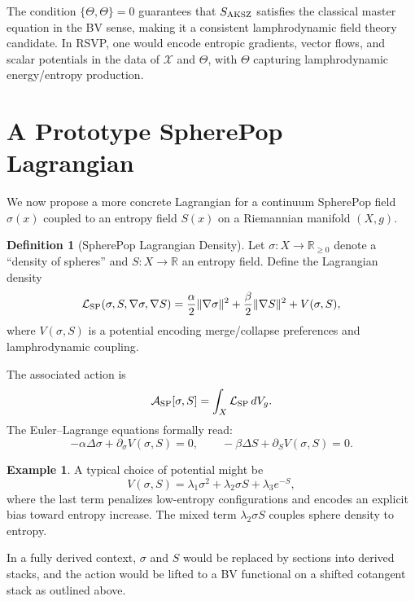 \documentclass[12pt]{article}
\theoremstyle{plain}
\theoremstyle{definition}
\newtheorem{definition}[theorem]{Definition}
\newtheorem{example}[theorem]{Example}
\theoremstyle{remark}
\begin{document}
The condition $\{\Theta,\Theta\}=0$ guarantees that $S_{\rm AKSZ}$ satisfies
the classical master equation in the BV sense, making it a consistent
lamphrodynamic field theory candidate. In RSVP, one would encode entropic
gradients, vector flows, and scalar potentials in the data of $\mathcal{X}$ and
$\Theta$, with $\Theta$ capturing lamphrodynamic energy/entropy production.


\section{A Prototype SpherePop Lagrangian}

We now propose a more concrete Lagrangian for a continuum SpherePop field
$\sigma(x)$ coupled to an entropy field $S(x)$ on a Riemannian manifold
$(X,g)$.

\begin{definition}[SpherePop Lagrangian Density]
Let $\sigma: X\to \mathbb{R}_{\ge 0}$ denote a ``density of spheres'' and
$S: X\to\mathbb{R}$ an entropy field. Define the Lagrangian density
\[
    \mathcal{L}_{\rm SP}(\sigma,S,\nabla\sigma,\nabla S)
    = \frac{\alpha}{2}\|\nabla\sigma\|^2
      + \frac{\beta}{2}\|\nabla S\|^2
      + V(\sigma,S),
\]
where $V(\sigma,S)$ is a potential encoding merge/collapse preferences and
lamphrodynamic coupling.
\end{definition}

The associated action is
\[
    \mathcal{A}_{\rm SP}[\sigma,S]
    = \int_X \mathcal{L}_{\rm SP}\, dV_g.
\]
The Euler--Lagrange equations formally read:
\[
    -\alpha \Delta \sigma + \partial_\sigma V(\sigma,S) = 0,
    \qquad
    -\beta \Delta S + \partial_S V(\sigma,S) = 0.
\]

\begin{example}
A typical choice of potential might be
\[
    V(\sigma,S)
    = \lambda_1 \sigma^2
      + \lambda_2 \sigma S
      + \lambda_3 e^{-S},
\]
where the last term penalizes low-entropy configurations and encodes an
explicit bias toward entropy increase. The mixed term $\lambda_2 \sigma S$
couples sphere density to entropy.
\end{example}

In a fully derived context, $\sigma$ and $S$ would be replaced by sections into
derived stacks, and the action would be lifted to a BV functional on a
shifted cotangent stack as outlined above.
\end{document}
